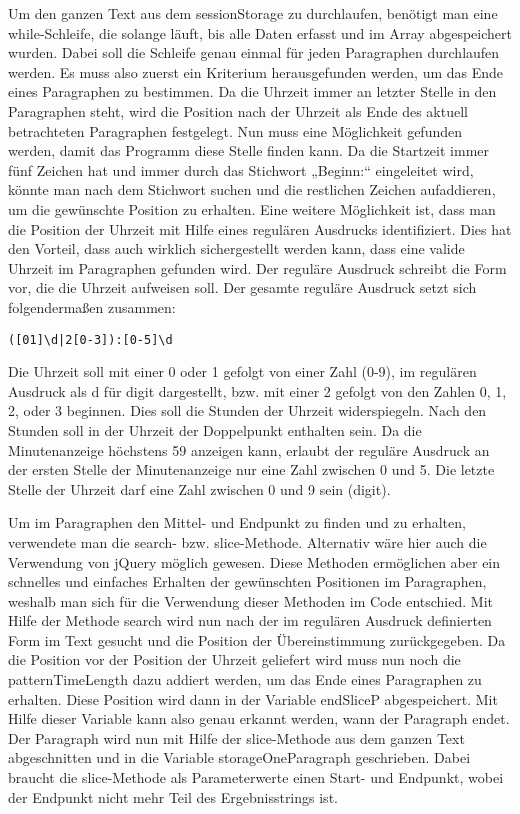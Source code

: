 {Um den ganzen Text aus dem sessionStorage zu durchlaufen, benötigt man eine while-Schleife, die solange läuft, bis alle Daten erfasst und im Array abgespeichert wurden. Dabei soll die Schleife genau einmal für jeden Paragraphen durchlaufen werden. Es muss also zuerst ein Kriterium herausgefunden werden, um das Ende eines Paragraphen zu bestimmen. Da die Uhrzeit immer an letzter Stelle in den Paragraphen steht, wird die Position nach der Uhrzeit als Ende des aktuell betrachteten Paragraphen festgelegt. Nun muss eine Möglichkeit gefunden werden, damit das Programm diese Stelle finden kann. Da die Startzeit immer fünf Zeichen hat und immer durch das Stichwort „Beginn:“ eingeleitet wird, könnte man nach dem Stichwort suchen und die restlichen Zeichen aufaddieren, um die gewünschte Position zu erhalten. Eine weitere Möglichkeit ist, dass man die Position der Uhrzeit mit Hilfe eines regulären Ausdrucks identifiziert. Dies hat den Vorteil, dass auch wirklich sichergestellt werden kann, dass eine valide Uhrzeit im Paragraphen gefunden wird. Der reguläre Ausdruck schreibt die Form vor, die die Uhrzeit aufweisen soll. Der gesamte reguläre Ausdruck setzt sich folgendermaßen zusammen:  
\begin{verbatim}
([01]\d|2[0-3]):[0-5]\d
\end{verbatim}
Die Uhrzeit soll mit einer 0 oder 1 gefolgt von einer Zahl (0-9), im regulären Ausdruck als d für digit dargestellt, bzw. mit einer 2 gefolgt von den Zahlen 0, 1, 2, oder 3 beginnen. Dies soll die Stunden der Uhrzeit widerspiegeln. Nach den Stunden soll in der Uhrzeit der Doppelpunkt enthalten sein. Da die Minutenanzeige höchstens 59 anzeigen kann, erlaubt der reguläre Ausdruck an der ersten Stelle der Minutenanzeige nur eine Zahl zwischen 0 und 5. Die letzte Stelle der Uhrzeit darf eine Zahl zwischen 0 und 9 sein (digit). 

Um im Paragraphen den Mittel- und Endpunkt zu finden und zu erhalten, verwendete man die search- bzw. slice-Methode. Alternativ wäre hier auch die Verwendung von jQuery möglich gewesen. Diese Methoden ermöglichen aber ein schnelles und einfaches Erhalten der gewünschten Positionen im Paragraphen, weshalb man sich für die Verwendung dieser Methoden im Code entschied.
Mit Hilfe der Methode search wird nun nach der im regulären Ausdruck definierten Form im Text gesucht und die Position der Übereinstimmung zurückgegeben. Da die Position vor der Position der Uhrzeit geliefert wird muss nun noch die patternTimeLength dazu addiert werden, um das Ende eines Paragraphen zu erhalten. Diese Position wird dann in der Variable endSliceP abgespeichert. Mit Hilfe dieser Variable kann also genau erkannt werden, wann der Paragraph endet. Der Paragraph wird nun mit Hilfe der slice-Methode aus dem ganzen Text abgeschnitten und in die Variable storageOneParagraph geschrieben. Dabei braucht die slice-Methode als Parameterwerte einen Start- und Endpunkt, wobei der Endpunkt nicht mehr Teil des Ergebnisstrings ist. 

}
